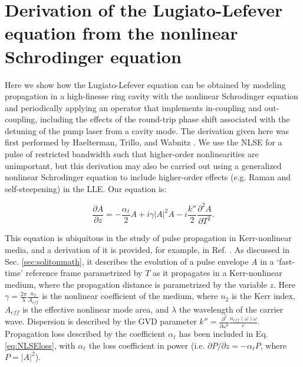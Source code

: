 \chapter{Derivation of the Lugiato-Lefever equation from the nonlinear Schrodinger equation}
 \label{app:LLEfromIkeda}


Here we show how the Lugiato-Lefever equation can be obtained by modeling propagation in a high-finesse ring cavity with the nonlinear Schrodinger equation and periodically applying an operator that implements in-coupling and out-coupling, including the effects of the round-trip phase shift associated with the detuning of the pump laser from a cavity mode. The derivation given here was first performed by Haelterman, Trillo, and Wabnitz \cite{Haelterman1992a}. We use the NLSE for a pulse of restricted bandwidth such that higher-order nonlinearities are unimportant, but this derivation may also be carried out using a generalized nonlinear Schrodinger equation to include higher-order effects (e.g. Raman and self-steepening) in the LLE. Our equation is:


\begin{equation}
\frac{\partial A}{\partial z}= -\frac{\alpha_\ell}{2} A+i\gamma|A|^2 A -i \frac{k''}{2} \frac{\partial^2 A}{\partial T^2}. \label{eq:NLSEloss}
\end{equation}

This equation is ubiquitous in the study of pulse propagation in Kerr-nonlinear media, and a derivation of it is provided, for example, in Ref. . As discussed in Sec. \ref{sec:solitonmath}, it describes the evolution of a pulse envelope $A$ in a `fast-time' reference frame parametrized by $T$ as it propagates in a Kerr-nonlinear medium, where the propagation distance is parametrized by the variable $z$. Here $\gamma=\frac{2\pi}{\lambda}\frac{n_2}{A_{eff}}$ is the nonlinear coefficient of the medium, where $n_2$ is the Kerr index, $A_{eff}$ is the effective nonlinear mode area, and $\lambda$ the wavelength of the carrier wave. Dispersion is described by the GVD parameter $k''=\frac{\partial^2}{\partial\omega^2}\frac{n_{eff}(\omega)\omega}{c}$. Propagation loss described by the coefficient $\alpha_\ell$  has been included in Eq. \ref{eq:NLSEloss}, with $\alpha_\ell$ the loss coefficient in power (i.e. $\partial P/\partial z=-\alpha_\ell P$, where $P=|A|^2$).

